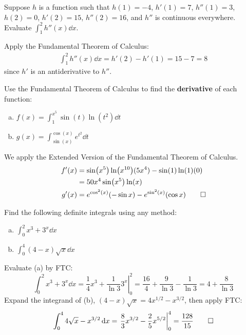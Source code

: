 \documentclass{agony}
\begin{document}
\begin{prob}
  Suppose $h$ is a function such that $h(1) = -4$, $h'(1) = 7$, $h''(1) = 3$,
  $h(2) = 0$, $h'(2) = 15$, $h''(2) = 16$, and $h''$ is continuous everywhere.
  Evaluate $\int_1^2 h''(x) \dd{x}$.
\end{prob}
\begin{sol}
  Apply the Fundamental Theorem of Calculus:
  \begin{align*}
    \int_1^2 h''(x) \dd{x} = h'(2) - h'(1) = 15 - 7 = 8
  \end{align*}
  since $h'$ is an antiderivative to $h''$.
\end{sol}

\begin{prob}
  Use the Fundamental Theorem of Calculus
  to find the \textbf{derivative} of each function:
  \begin{enumerate}[(a)]
    \item $f(x) = {\displaystyle\int_1^{x^5}}\sin(t)\ln(t^2) \dd{t}$
    \item $g(x) = {\displaystyle\int_{\sin(x)}^{\cos(x)}}e^{t^2} \dd{t}$
  \end{enumerate}
\end{prob}
\begin{sol}
  We apply the Extended Version of the Fundamental Theorem of Calculus.
  \begin{align*}
    f'(x) & = \sin(x^5)\ln(x^{10})(5x^4) - \sin(1)\ln(1)(0)             \\
          & = 50x^4\sin(x^5)\ln(x)                                      \\
    g'(x) & = e^{\cos[2](x)}(-\sin x) - e^{\sin[2](x)}(\cos x) \qedhere
  \end{align*}
\end{sol}

\begin{prob}
  Find the following definite integrals using any method:
  \begin{enumerate}[(a)]
    \item $\int_0^2 x^3 + 3^x \dd{x}$
    \item $\int_0^4 (4-x)\sqrt{x} \dd{x}$
  \end{enumerate}
\end{prob}
\begin{sol}
  Evaluate (a) by FTC:\@
  \[
    \int_0^2 x^3 + 3^x \dd{x}
    = \left. \frac{1}{4}x^3 + \frac{1}{\ln 3}3^x \right|_0^2
    = \frac{16}{4} + \frac{9}{\ln 3} - \frac{1}{\ln 3}
    = 4+\frac{8}{\ln 3}
  \]
  Expand the integrand of (b), $(4-x)\sqrt{x} = 4x^{1/2} - x^{3/2}$, then apply FTC:\@
  \[
    \int_0^4 4\sqrt{x} - x^{3/2} \dd{x}
    = \left. \frac{8}{3}x^{3/2} - \frac{2}{5}x^{5/2} \right|_0^4
    = \frac{128}{15} \qedhere
  \]
\end{sol}
\end{document}
